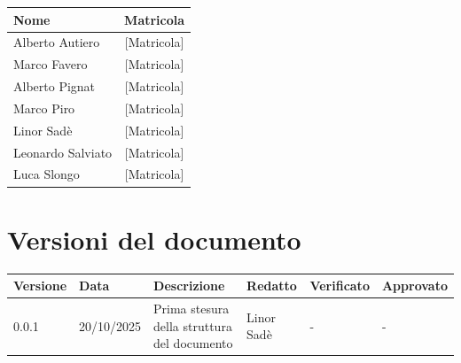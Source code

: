 \documentclass[a4paper,12pt]{article}
\newcommand{\CurrentVersion}{0.0.1} %
\begin{document}
\vspace{0.5cm}

\begin{center}
\begin{tcolorbox}[colback=lightgray,colframe=primaryblue,width=0.85\textwidth,arc=3mm,boxrule=0.5pt,title={\bfseries Il team BugBusters}]
\begin{center}
\begin{tabular}{lc}
\toprule
\textbf{Nome} & \textbf{Matricola} \\
\midrule
Alberto Autiero & {[Matricola]} \\
Marco Favero & {[Matricola]} \\
Alberto Pignat & {[Matricola]} \\
Marco Piro & {[Matricola]} \\
Linor Sadè & {[Matricola]} \\
Leonardo Salviato & {[Matricola]} \\
Luca Slongo & {[Matricola]} \\
\bottomrule
\end{tabular}
\end{center}
\end{tcolorbox}
\end{center}

\vspace{1cm}

\section{Versioni del documento}
{\footnotesize
\begin{tabularx}{\textwidth}{|p{1.5cm}|p{2cm}|X|p{2cm}|p{2cm}|p{2cm}|}
\hline
\textbf{Versione} & \textbf{Data} & \textbf{Descrizione} & \textbf{Redatto} & \textbf{Verificato} & \textbf{Approvato} \\
\hline
\CurrentVersion & 20/10/2025 & Prima stesura della struttura del documento & Linor Sadè & - & - \\
\hline
\end{tabularx}
}

\newpage

\renewcommand{\cftsecpagefont}{\normalfont}
\renewcommand{\cftsecleader}{\cftdotfill{\cftsecdotsep}}
\setlength{\cftbeforesecskip}{2pt}
\begin{center}
\begin{tcolorbox}[colback=lightgray,colframe=darkgray,width=0.9\textwidth,arc=2mm,boxrule=0.5pt]
\tableofcontents
\end{tcolorbox}
\end{center}
\end{document}
